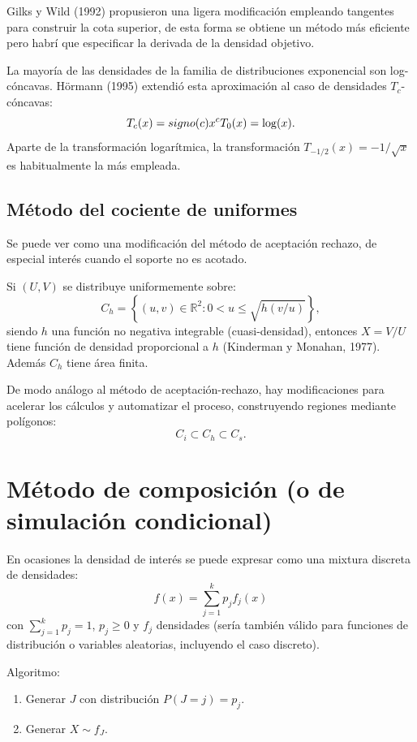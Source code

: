 \documentclass[
]{book}
\theoremstyle{break}
\theoremstyle{definition}
\theoremstyle{definition}
\theoremstyle{definition}
\theoremstyle{remark}
\begin{document}
Gilks y Wild (1992) propusieron una ligera modificación empleando tangentes para construir la cota superior, de esta forma se obtiene un método más eficiente pero habrí que especificar la derivada de la densidad objetivo.

La mayoría de las densidades de la familia de distribuciones exponencial son log-cóncavas.
Hörmann (1995) extendió esta aproximación al caso de densidades \(T_{c}\)-cóncavas:
\[T_{c}(x) = signo(c)x^{c} \\
T_{0}(x) = \log (x).\]
Aparte de la transformación logarítmica, la transformación \(T_{-1/2}(x)=-1/\sqrt{x}\) es habitualmente la más empleada.

\hypertarget{muxe9todo-del-cociente-de-uniformes}{%
\subsection{Método del cociente de uniformes}\label{muxe9todo-del-cociente-de-uniformes}}

Se puede ver como una modificación del método de aceptación rechazo,
de especial interés cuando el soporte no es acotado.

Si \((U,V)\) se distribuye uniformemente sobre:
\[C_{h} = \left\{ \left( u,v\right) \in \mathbb{R}^{2} : 
0<u\leq \sqrt{h(v/u)} \right\},\]
siendo \(h\) una función no negativa integrable
(cuasi-densidad), entonces \(X=V/U\) tiene función de densidad
proporcional a \(h\) (Kinderman y Monahan, 1977).
Además \(C_{h}\) tiene área finita.

De modo análogo al método de aceptación-rechazo, hay modificaciones
para acelerar los cálculos y automatizar el proceso, construyendo
regiones mediante polígonos:\[C_{i}\subset C_{h}\subset C_{s}.\]

\hypertarget{composicion}{%
\section{Método de composición (o de simulación condicional)}\label{composicion}}

En ocasiones la densidad de interés se puede expresar como una
mixtura discreta de densidades:
\[f(x)=\sum_{j=1}^{k}p_{j}f_{j}(x)\]
con \(\sum_{j=1}^{k}p_j=1\), \(p_j\geq 0\) y \(f_j\) densidades
(sería también válido para funciones de distribución o variables aleatorias,
incluyendo el caso discreto).

Algoritmo:

\begin{enumerate}
\def\labelenumi{\arabic{enumi}.}
\item
  Generar \(J\) con distribución \(P\left( J=j \right) = p_j\).
\item
  Generar \(X\sim f_J\).
\end{enumerate}
\end{document}
